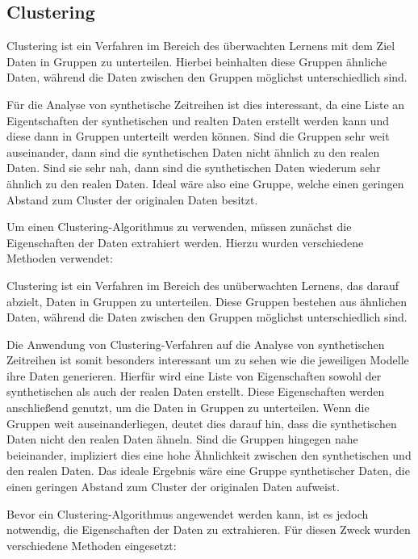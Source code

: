 \subsection{Clustering}
Clustering ist ein Verfahren im Bereich des überwachten Lernens mit dem Ziel Daten in Gruppen zu unterteilen.
Hierbei beinhalten diese Gruppen ähnliche Daten, während die Daten zwischen den Gruppen möglichst unterschiedlich sind.

Für die Analyse von synthetische Zeitreihen ist dies interessant, da eine Liste an Eigentschaften der synthetischen und realten Daten erstellt 
werden kann und diese dann in Gruppen unterteilt werden können.
Sind die Gruppen sehr weit auseinander, dann sind die synthetischen Daten nicht ähnlich zu den realen Daten. Sind sie sehr nah, dann sind die 
synthetischen Daten wiederum sehr ähnlich zu den realen Daten. Ideal wäre also eine Gruppe, welche einen geringen Abstand zum Cluster der originalen Daten besitzt.

Um einen Clustering-Algorithmus zu verwenden, müssen zunächst die Eigenschaften der Daten extrahiert werden. Hierzu wurden verschiedene Methoden verwendet:


Clustering ist ein Verfahren im Bereich des unüberwachten Lernens, das darauf abzielt, Daten in Gruppen zu unterteilen. Diese Gruppen bestehen aus ähnlichen Daten, 
während die Daten zwischen den Gruppen möglichst unterschiedlich sind.

Die Anwendung von Clustering-Verfahren auf die Analyse von synthetischen Zeitreihen ist somit besonders interessant um zu sehen wie die jeweiligen Modelle ihre Daten generieren. 
Hierfür wird eine Liste von Eigenschaften sowohl der synthetischen als auch der realen Daten erstellt. 
Diese Eigenschaften werden anschließend genutzt, um die Daten in Gruppen zu unterteilen. Wenn die Gruppen weit auseinanderliegen, deutet dies darauf hin, dass die synthetischen Daten nicht den realen Daten ähneln. 
Sind die Gruppen hingegen nahe beieinander, impliziert dies eine hohe Ähnlichkeit zwischen den synthetischen und den realen Daten. Das ideale Ergebnis wäre eine Gruppe synthetischer Daten, die einen geringen Abstand zum Cluster der originalen Daten aufweist.

Bevor ein Clustering-Algorithmus angewendet werden kann, ist es jedoch notwendig, die Eigenschaften der Daten zu extrahieren. Für diesen Zweck wurden verschiedene Methoden eingesetzt:


